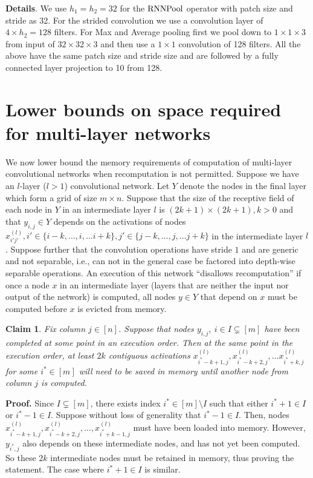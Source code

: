 \documentclass[10pt]{article}
\newcommand{\rpool}{\ensuremath{{\rm RNNPool}}\xspace}
\newtheorem{claim}{Claim}
\begin{document}
\textbf{Details}. We use $h_1=h_2=32$ for the \rpool operator with
patch size and stride as 32. For the strided convolution we use a
convolution layer of $4 \times h_2=128$ filters. For Max and Average
pooling first we pool down to $1 \times 1 \times 3$ from input of $32
\times 32 \times 3$ and then use a $1 \times 1$ convolution of 128
filters. All the above have the same patch size and stride size and
are followed by a fully connected layer projection to 10 from 128.




 
\section{Lower bounds on space required for multi-layer networks}
\label{sec:space}

We now lower bound the memory requirements of computation of
multi-layer convolutional networks when recomputation is not
permitted.  Suppose we have an $l$-layer ($l>1$) convolutional network.
Let $Y$ denote the nodes in the final layer which form a grid of size
$m\times n$.  Suppose that the size of the receptive field of each node in
$Y$ in an intermediate layer $l$ is $(2k+1)\times(2k+1), k>0$ and that
$y_{i,j}\in Y$ depends on the activations of nodes $x^{(l)}_{i'j'},
i'\in\{i-k, \dots, i, \dots i+k\}, j'\in\{j-k, \dots, j, \dots j+k\}$ in the
intermediate layer $l$.  Suppose further that the convolution
operations have stride $1$ and are generic and not separable, i.e.,
can not in the general case be factored into depth-wise separable
operations.  An execution of this network ``disallows recomputation''
if once a node $x$ in an intermediate layer (layers that are neither
the input nor output of the network) is computed, all nodes $y\in Y$
that depend on $x$ must be computed before $x$ is evicted from memory.

\begin{claim}
\label{cl:mem}
Fix column $j\in [n]$. Suppose that nodes $y_{i,j},\ i \in I\subsetneq
[m]$ have been completed at some point in an execution order. Then at
the same point in the execution order, at least $2k$ contiguous
activations $x^{(l)}_{i^{*}-k+1,j}, x^{(l)}_{i^{*}-k+2,j}, \dots
x^{(l)}_{i^{*}+k,j}$ for some $i^{*}\in[m]$ will need to be saved in
memory until another node from column $j$ is computed.
\end{claim}

\textbf{Proof.}
Since $I\subsetneq[m]$, there exists index $i^{*}\in[m]\setminus I$
such that either $i^{*}+1 \in I$ or $i^{*}-1 \in I$. Suppose without
loss of generality that $i^{*}-1 \in I$. Then, nodes
$x^{(l)}_{i^{*}-k+1,j}, x^{(l)}_{i^{*}-k+2,j}, \dots,
x^{(l)}_{i^{*}+k-1,j}$ must have been loaded into memory. However,
$y_{i^{*},j}$ also depends on these intermediate nodes, and has not
yet been computed. So these $2k$ intermediate nodes must be retained
in memory, thus proving the statement. The case where $i^{*}+1 \in I$
is similar.
\end{document}
